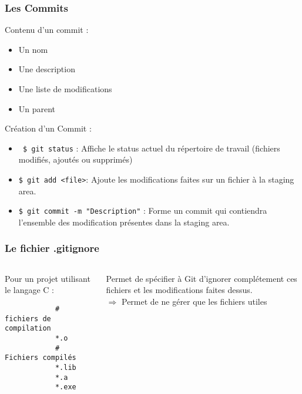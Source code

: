 \documentclass{beamer}
\begin{document}
\begin{frame}[fragile]
	\frametitle{Les Commits}
	Contenu d'un commit : 
	\begin{itemize}
		\item Un nom
		\item Une description
		\item Une liste de modifications
		\item Un parent
	\end{itemize}
	Création d'un Commit :
	\begin{itemize}
		\item \verb| $ git status| : Affiche le status actuel du répertoire de travail (fichiers modifiés, ajoutés ou supprimés)
		\item \verb|$ git add <file>|: Ajoute les modifications faites sur un fichier à la staging area. \\
		\item \verb|$ git commit -m "Description"| : Forme un commit qui contiendra l'ensemble des modification présentes dans la staging area.
	\end{itemize}
\end{frame}
\begin{frame}[fragile]
	\frametitle{Le fichier .gitignore}
	\begin{columns}[c]
		\begin{column}{5cm}
			Pour un projet utilisant le langage C : \\
			\begin{verbatim}
			# fichiers de compilation
			*.o
			# Fichiers compilés
			*.lib
			*.a
			*.exe
			\end{verbatim}
		\end{column}
		\begin{column}{5cm}
			Permet de spécifier à Git d'ignorer complétement ces fichiers et les modifications faites dessus. \\
			$\Rightarrow$ Permet de ne gérer que les fichiers utiles
		\end{column}
	\end{columns}
\end{frame}
\end{document}
